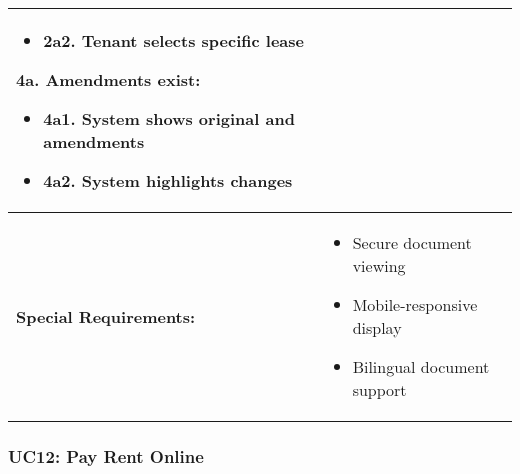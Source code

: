 \documentclass[12pt]{article}
\begin{document}
\begin{longtable}{|p{3cm}|p{11cm}|}
\begin{itemize}
    \item 2a2. Tenant selects specific lease
\end{itemize}
\textbf{4a. Amendments exist:}
\begin{itemize}
    \item 4a1. System shows original and amendments
    \item 4a2. System highlights changes
\end{itemize} \\
\hline
\textbf{Special Requirements:} & 
\begin{itemize}
    \item Secure document viewing
    \item Mobile-responsive display
    \item Bilingual document support
\end{itemize} \\
\hline
\end{longtable}

\subsubsection{UC12: Pay Rent Online}
\end{document}
